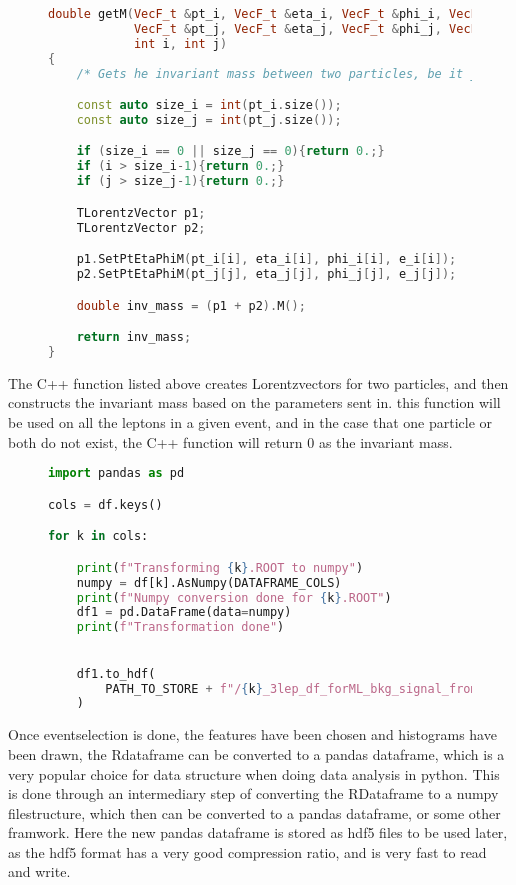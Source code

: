 \begin{figure}
    \centering
\begin{lstlisting}[language=C++, style=cppstyle, label={code:cpp_func_example}]
double getM(VecF_t &pt_i, VecF_t &eta_i, VecF_t &phi_i, VecF_t &e_i,
            VecF_t &pt_j, VecF_t &eta_j, VecF_t &phi_j, VecF_t &e_j,
            int i, int j)
{
    /* Gets he invariant mass between two particles, be it jets or leptons */

    const auto size_i = int(pt_i.size());
    const auto size_j = int(pt_j.size());

    if (size_i == 0 || size_j == 0){return 0.;}
    if (i > size_i-1){return 0.;}
    if (j > size_j-1){return 0.;}

    TLorentzVector p1;
    TLorentzVector p2;

    p1.SetPtEtaPhiM(pt_i[i], eta_i[i], phi_i[i], e_i[i]);
    p2.SetPtEtaPhiM(pt_j[j], eta_j[j], phi_j[j], e_j[j]);

    double inv_mass = (p1 + p2).M();

    return inv_mass;
}
\end{lstlisting}
\end{figure}
The C++ function listed above creates Lorentzvectors for two particles, and then constructs the invariant mass based on the parameters sent in. 
this function will be used on all the leptons in a given event, and in the case that one particle or both do not exist, the C++ function will
return 0 as the invariant mass. \par

\begin{figure}
    \centering
\begin{lstlisting}[language=Python, style=pythonstyle, label={code:python_func_example_2}]
import pandas as pd 

cols = df.keys()

for k in cols:

    print(f"Transforming {k}.ROOT to numpy")
    numpy = df[k].AsNumpy(DATAFRAME_COLS)
    print(f"Numpy conversion done for {k}.ROOT")
    df1 = pd.DataFrame(data=numpy)
    print(f"Transformation done")
    

    df1.to_hdf(
        PATH_TO_STORE + f"/{k}_3lep_df_forML_bkg_signal_fromRDF.hdf5", "mini"
    )

\end{lstlisting}
\end{figure}

Once eventselection is done, the features have been chosen and histograms have been drawn, the Rdataframe can be converted to a pandas dataframe, which is a very popular choice
for data structure when doing data analysis in python. This is done through an intermediary step of converting the RDataframe to a numpy filestructure, which then can be converted
to a pandas\cite{reback2020pandas} dataframe, or some other framwork. Here the new pandas dataframe is stored as hdf5\cite{hdf5} files to be used later, as the hdf5 format 
has a very good compression ratio, and is very fast to read and write. 
